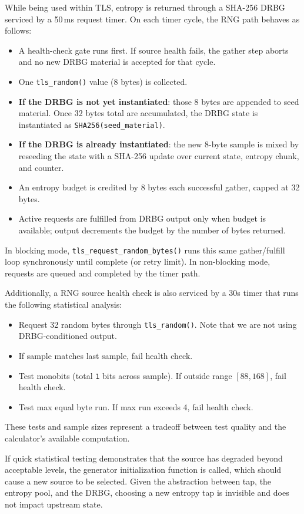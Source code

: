\documentclass[titlepage]{report}
\begin{document}
		While being used within TLS, entropy is returned through a SHA-256 DRBG serviced by a 50\,ms request timer. On each timer cycle, the RNG path behaves as follows:
		\begin{itemize}
			\item A health-check gate runs first. If source health fails, the gather step aborts and no new DRBG material is accepted for that cycle.
			\item One \texttt{tls\_random()} value (8 bytes) is collected.
			\item \textbf{If the DRBG is not yet instantiated}: those 8 bytes are appended to seed material. Once 32 bytes total are accumulated, the DRBG state is instantiated as \texttt{SHA256(seed\_material)}.
			\item \textbf{If the DRBG is already instantiated}: the new 8-byte sample is mixed by reseeding the state with a SHA-256 update over current state, entropy chunk, and counter.
			\item An entropy budget is credited by 8 bytes each successful gather, capped at 32 bytes.
			\item Active requests are fulfilled from DRBG output only when budget is available; output decrements the budget by the number of bytes returned.
		\end{itemize}
		In blocking mode, \texttt{tls\_request\_random\_bytes()} runs this same gather/fulfill loop synchronously until complete (or retry limit). In non-blocking mode, requests are queued and completed by the timer path.
		
		Additionally, a RNG source health check is also serviced by a 30s timer that runs the following statistical analysis:
		\begin{itemize}
			\item Request 32 random bytes through \texttt{tls\_random()}. Note that we are not using DRBG-conditioned output.
			\item If sample matches last sample, fail health check.
			\item Test monobits (total \texttt{1} bits across sample). If outside range $[88, 168]$, fail health check.
			\item Test max equal byte run. If max run exceeds 4, fail health check.
		\end{itemize}
		These tests and sample sizes represent a tradeoff between test quality and the calculator's available computation.
		
		If quick statistical testing demonstrates that the source has degraded beyond acceptable levels, the generator initialization function is called, which should cause a new source to be selected. Given the abstraction between tap, the entropy pool, and the DRBG, choosing a new entropy tap is invisible and does not impact upstream state.
\end{document}
